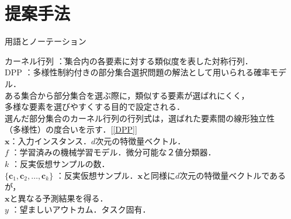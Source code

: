 \documentclass[dvipdfmx]{jreport}
\begin{document}
\section{提案手法}
\begin{itembox}[l]{\large{用語とノーテーション}}
    \begin{tabbing}
        \hspace{15pt} \raisebox{0.5ex}{\tiny $\bullet$} カーネル行列 \hspace{7pt}\=：集合内の各要素に対する類似度を表した対称行列．\\[0.5em]
        \hspace{15pt} \raisebox{0.5ex}{\tiny $\bullet$} DPP \>：多様性制約付きの部分集合選択問題の解法として用いられる確率モデル．\\[0.5em]\>\hspace{6.5pt}ある集合から部分集合を選ぶ際に，類似する要素が選ばれにくく，\\[0.5em]\>\hspace{6.5pt}多様な要素を選びやすくする目的で設定される．\\[0.5em]\>\hspace{6.5pt}選んだ部分集合のカーネル行列の行列式は，選ばれた要素間の線形独立性\\[0.5em]\>\hspace{6.5pt}（多様性）の度合いを示す．[\ref{DPP}]\\[0.5em]
        \hspace{15pt} \raisebox{0.5ex}{\tiny $\bullet$} $\bm{x}$\>：入力インスタンス．$d$次元の特徴量ベクトル．\\[0.5em]
        \hspace{15pt} \raisebox{0.5ex}{\tiny $\bullet$} $f$ \>：学習済みの機械学習モデル．微分可能な２値分類器．\\[0.5em]
        \hspace{15pt} \raisebox{0.5ex}{\tiny $\bullet$} $k$ \>：反実仮想サンプルの数．\\[0.5em]
        \hspace{15pt} \raisebox{0.5ex}{\tiny $\bullet$} $\{ \bm{c}_1, \bm{c}_2, \ldots, \bm{c}_k \}$ \>：反実仮想サンプル．$\bm{x}$と同様に$d$次元の特徴量ベクトルであるが，\\[0.5em]\>\hspace{6.5pt}$\bm{x}$と異なる予測結果を得る．\\[0.5em]
        \hspace{15pt} \raisebox{0.5ex}{\tiny $\bullet$} $y$ \>：望ましいアウトカム．タスク固有．\\[0.5em]

\end{tabbing}
\end{itembox}
\end{document}
